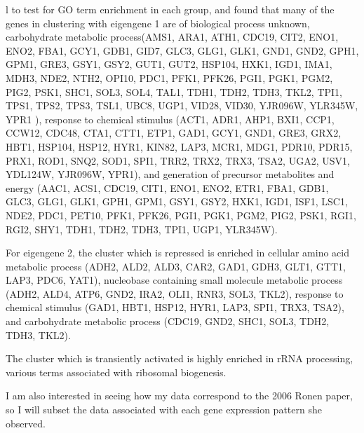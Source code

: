 \documentclass[letter]{article}\usepackage{graphicx, color}
\begin{document}
l to test for GO term enrichment in each group, and found that many of the genes in clustering with eigengene 1 are of biological process unknown, carbohydrate metabolic process(AMS1, ARA1, ATH1, CDC19, CIT2, ENO1, ENO2, FBA1, GCY1, GDB1, GID7, GLC3, GLG1, GLK1, GND1, GND2, GPH1, GPM1, GRE3, GSY1, GSY2, GUT1, GUT2, HSP104, HXK1, IGD1, IMA1, MDH3, NDE2, NTH2, OPI10, PDC1, PFK1, PFK26, PGI1, PGK1, PGM2, PIG2, PSK1, SHC1, SOL3, SOL4, TAL1, TDH1, TDH2, TDH3, TKL2, TPI1, TPS1, TPS2, TPS3, TSL1, UBC8, UGP1, VID28, VID30, YJR096W, YLR345W, YPR1
), response to chemical stimulus (ACT1, ADR1, AHP1, BXI1, CCP1, CCW12, CDC48, CTA1, CTT1, ETP1, GAD1, GCY1, GND1, GRE3, GRX2, HBT1, HSP104, HSP12, HYR1, KIN82, LAP3, MCR1, MDG1, PDR10, PDR15, PRX1, ROD1, SNQ2, SOD1, SPI1, TRR2, TRX2, TRX3, TSA2, UGA2, USV1, YDL124W, YJR096W, YPR1), and generation of precursor metabolites and energy (AAC1, ACS1, CDC19, CIT1, ENO1, ENO2, ETR1, FBA1, GDB1, GLC3, GLG1, GLK1, GPH1, GPM1, GSY1, GSY2, HXK1, IGD1, ISF1, LSC1, NDE2, PDC1, PET10, PFK1, PFK26, PGI1, PGK1, PGM2, PIG2, PSK1, RGI1, RGI2, SHY1, TDH1, TDH2, TDH3, TPI1, UGP1, YLR345W).

For eigengene 2, the cluster which is repressed is enriched in cellular amino acid metabolic process (ADH2, ALD2, ALD3, CAR2, GAD1, GDH3, GLT1, GTT1, LAP3, PDC6, YAT1), nucleobase containing small molecule metabolic process (ADH2, ALD4, ATP6, GND2, IRA2, OLI1, RNR3, SOL3, TKL2), response to chemical stimulus (GAD1, HBT1, HSP12, HYR1, LAP3, SPI1, TRX3, TSA2), and carbohydrate metabolic process (CDC19, GND2, SHC1, SOL3, TDH2, TDH3, TKL2).

The cluster which is transiently activated is highly enriched in rRNA processing, various terms associated with ribosomal biogenesis.

I am also interested in seeing how my data correspond to the 2006 Ronen paper, so I will subset the data associated with each gene expression pattern she observed.
\end{document}
